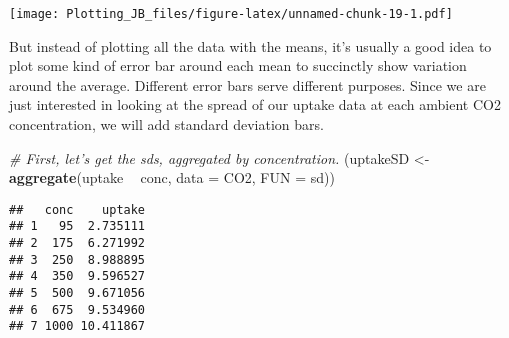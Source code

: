 \documentclass[]{article}
\newenvironment{Shaded}{\begin{snugshade}}{\end{snugshade}}
\newcommand{\CommentTok}[1]{\textcolor[rgb]{0.56,0.35,0.01}{\textit{#1}}}
\newcommand{\DataTypeTok}[1]{\textcolor[rgb]{0.13,0.29,0.53}{#1}}
\newcommand{\DecValTok}[1]{\textcolor[rgb]{0.00,0.00,0.81}{#1}}
\newcommand{\KeywordTok}[1]{\textcolor[rgb]{0.13,0.29,0.53}{\textbf{#1}}}
\newcommand{\NormalTok}[1]{#1}
\newcommand{\OperatorTok}[1]{\textcolor[rgb]{0.81,0.36,0.00}{\textbf{#1}}}
\newcommand{\StringTok}[1]{\textcolor[rgb]{0.31,0.60,0.02}{#1}}
\begin{document}
\begin{Shaded}
\end{Shaded}

\texttt{[image: Plotting\_JB\_files/figure-latex/unnamed-chunk-19-1.pdf]}

But instead of plotting all the data with the means, it's usually a good
idea to plot some kind of error bar around each mean to succinctly show
variation around the average. Different error bars serve different
purposes. Since we are just interested in looking at the spread of our
uptake data at each ambient CO2 concentration, we will add standard
deviation bars.

\begin{Shaded}
\begin{Highlighting}[]
\CommentTok{# First, let's get the sds, aggregated by concentration. }
\NormalTok{(uptakeSD <-}\StringTok{ }\KeywordTok{aggregate}\NormalTok{(uptake }\OperatorTok{~}\StringTok{ }\NormalTok{conc, }\DataTypeTok{data =}\NormalTok{ CO2, }\DataTypeTok{FUN =}\NormalTok{ sd))}
\end{Highlighting}
\end{Shaded}

\begin{verbatim}
##   conc    uptake
## 1   95  2.735111
## 2  175  6.271992
## 3  250  8.988895
## 4  350  9.596527
## 5  500  9.671056
## 6  675  9.534960
## 7 1000 10.411867
\end{verbatim}
\end{document}
